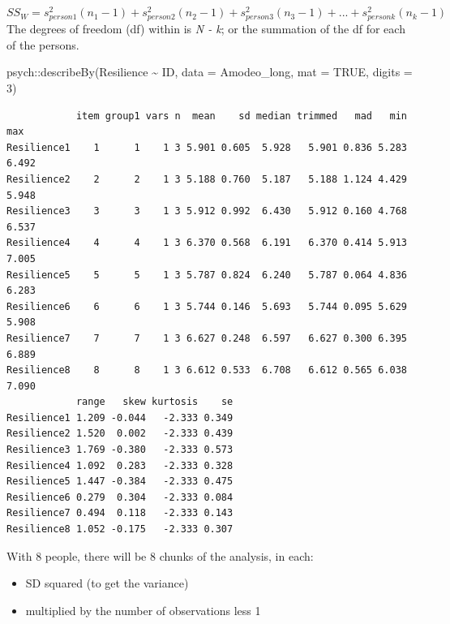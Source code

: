 \documentclass[
  11pt,
]{book}
\newenvironment{Shaded}{\begin{snugshade}}{\end{snugshade}}
\newcommand{\AttributeTok}[1]{\textcolor[rgb]{0.77,0.63,0.00}{#1}}
\newcommand{\ConstantTok}[1]{\textcolor[rgb]{0.00,0.00,0.00}{#1}}
\newcommand{\DecValTok}[1]{\textcolor[rgb]{0.00,0.00,0.81}{#1}}
\newcommand{\FunctionTok}[1]{\textcolor[rgb]{0.00,0.00,0.00}{#1}}
\newcommand{\NormalTok}[1]{#1}
\newcommand{\SpecialCharTok}[1]{\textcolor[rgb]{0.00,0.00,0.00}{#1}}
\providecommand{\tightlist}{%
  \setlength{\itemsep}{0pt}\setlength{\parskip}{0pt}}
\begin{document}
\[SS_W = s_{person1}^{2}(n_{1}-1)+s_{person2}^{2}(n_{2}-1)+s_{person3}^{2}(n_{3}-1)+...+s_{personk}^{2}(n_{k}-1)\]
The degrees of freedom (df) within is \emph{N - k}; or the summation of the df for each of the persons.

\begin{Shaded}
\begin{Highlighting}[]
\NormalTok{psych}\SpecialCharTok{::}\FunctionTok{describeBy}\NormalTok{(Resilience }\SpecialCharTok{\textasciitilde{}}\NormalTok{ ID, }\AttributeTok{data =}\NormalTok{ Amodeo\_long, }\AttributeTok{mat =} \ConstantTok{TRUE}\NormalTok{, }\AttributeTok{digits =} \DecValTok{3}\NormalTok{)}
\end{Highlighting}
\end{Shaded}

\begin{verbatim}
            item group1 vars n  mean    sd median trimmed   mad   min   max
Resilience1    1      1    1 3 5.901 0.605  5.928   5.901 0.836 5.283 6.492
Resilience2    2      2    1 3 5.188 0.760  5.187   5.188 1.124 4.429 5.948
Resilience3    3      3    1 3 5.912 0.992  6.430   5.912 0.160 4.768 6.537
Resilience4    4      4    1 3 6.370 0.568  6.191   6.370 0.414 5.913 7.005
Resilience5    5      5    1 3 5.787 0.824  6.240   5.787 0.064 4.836 6.283
Resilience6    6      6    1 3 5.744 0.146  5.693   5.744 0.095 5.629 5.908
Resilience7    7      7    1 3 6.627 0.248  6.597   6.627 0.300 6.395 6.889
Resilience8    8      8    1 3 6.612 0.533  6.708   6.612 0.565 6.038 7.090
            range   skew kurtosis    se
Resilience1 1.209 -0.044   -2.333 0.349
Resilience2 1.520  0.002   -2.333 0.439
Resilience3 1.769 -0.380   -2.333 0.573
Resilience4 1.092  0.283   -2.333 0.328
Resilience5 1.447 -0.384   -2.333 0.475
Resilience6 0.279  0.304   -2.333 0.084
Resilience7 0.494  0.118   -2.333 0.143
Resilience8 1.052 -0.175   -2.333 0.307
\end{verbatim}

With 8 people, there will be 8 chunks of the analysis, in each:

\begin{itemize}
\tightlist
\item
  SD squared (to get the variance)
\item
  multiplied by the number of observations less 1
\end{itemize}
\end{document}
